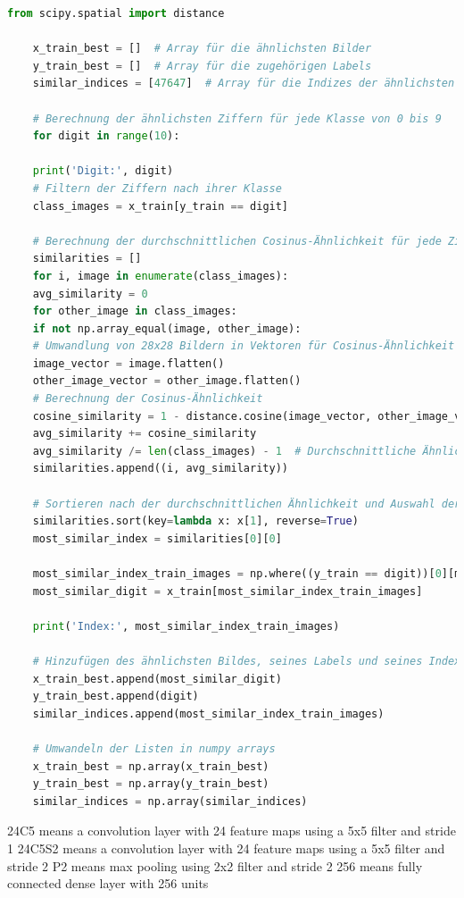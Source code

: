 \documentclass[
fontsize=12pt,					%
paper=a4,						%
twoside=true, 					%
listof=totoc, 					%
bibliography=totoc,				%
titlepage, 						%
headsepline, 					%
DIV=12,							%
BCOR=6mm,						%
cleardoublepage=empty,			%
parskip,							%
ngerman
]{scrartcl}
\begin{document}
\begin{lstlisting}[language=Python, caption=Python-Code, label=python_code]
	from scipy.spatial import distance
	
	x_train_best = []  # Array für die ähnlichsten Bilder
	y_train_best = []  # Array für die zugehörigen Labels
	similar_indices = [47647]  # Array für die Indizes der ähnlichsten Bilder
	
	# Berechnung der ähnlichsten Ziffern für jede Klasse von 0 bis 9
	for digit in range(10):
	
	print('Digit:', digit)
	# Filtern der Ziffern nach ihrer Klasse
	class_images = x_train[y_train == digit]
	
	# Berechnung der durchschnittlichen Cosinus-Ähnlichkeit für jede Ziffer zu anderen Ziffern derselben Klasse
	similarities = []
	for i, image in enumerate(class_images):
	avg_similarity = 0
	for other_image in class_images:
	if not np.array_equal(image, other_image):
	# Umwandlung von 28x28 Bildern in Vektoren für Cosinus-Ähnlichkeit
	image_vector = image.flatten()
	other_image_vector = other_image.flatten()
	# Berechnung der Cosinus-Ähnlichkeit
	cosine_similarity = 1 - distance.cosine(image_vector, other_image_vector)
	avg_similarity += cosine_similarity
	avg_similarity /= len(class_images) - 1  # Durchschnittliche Ähnlichkeit zu allen anderen Ziffern der Klasse außer sich selbst
	similarities.append((i, avg_similarity))
	
	# Sortieren nach der durchschnittlichen Ähnlichkeit und Auswahl der ähnlichsten Ziffer
	similarities.sort(key=lambda x: x[1], reverse=True)
	most_similar_index = similarities[0][0]
	
	most_similar_index_train_images = np.where((y_train == digit))[0][most_similar_index]
	most_similar_digit = x_train[most_similar_index_train_images]
	
	print('Index:', most_similar_index_train_images)
	
	# Hinzufügen des ähnlichsten Bildes, seines Labels und seines Index im train_images Array in den Arrays
	x_train_best.append(most_similar_digit)
	y_train_best.append(digit)
	similar_indices.append(most_similar_index_train_images)
	
	# Umwandeln der Listen in numpy arrays
	x_train_best = np.array(x_train_best)
	y_train_best = np.array(y_train_best)
	similar_indices = np.array(similar_indices)
\end{lstlisting}

24C5 means a convolution layer with 24 feature maps using a 5x5 filter and stride 1
24C5S2 means a convolution layer with 24 feature maps using a 5x5 filter and stride 2
P2 means max pooling using 2x2 filter and stride 2
256 means fully connected dense layer with 256 units
\end{document}
